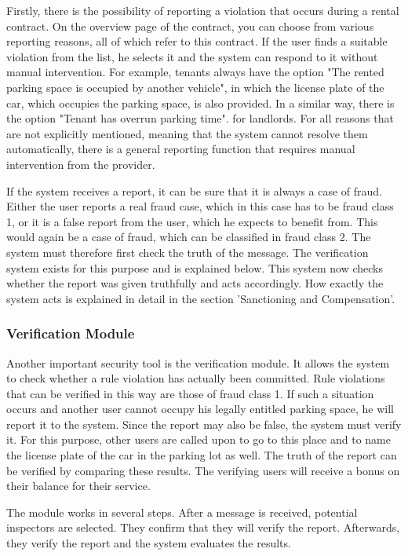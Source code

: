 \documentclass[
a4paper,     %
titlepage,   %
14pt         %
]{scrartcl}  %
\theoremstyle{mystyle}
\begin{document}
Firstly, there is the possibility of reporting a violation that occurs during a rental contract. On the overview page of the contract, you can choose from various reporting reasons, all of which refer to this contract. If the user finds a suitable violation from the list, he selects it and the system can respond to it without manual intervention. For example, tenants always have the option "The rented parking space is occupied by another vehicle", in which the license plate of the car, which occupies the parking space, is also provided. In a similar way, there is the option "Tenant has overrun parking time". for landlords. For all reasons that are not explicitly mentioned, meaning that the system cannot resolve them automatically, there is a general reporting function that requires manual intervention from the provider.

If the system receives a report, it can be sure that it is always a case of fraud. Either the user reports a real fraud case, which in this case has to be fraud class 1, or it is a false report from the user, which he expects to benefit from. This would again be a case of fraud, which can be classified in fraud class 2. The system must therefore first check the truth of the message. The verification system exists for this purpose and is explained below. This system now checks whether the report was given truthfully and acts accordingly. How exactly the system acts is explained in detail in the section 'Sanctioning and Compensation'.

\subsubsection{Verification Module} Another important security tool is the verification module. It allows the system to check whether a rule violation has actually been committed. Rule violations that can be verified in this way are those of fraud class 1. If such a situation occurs and another user cannot occupy his legally entitled parking space, he will report it to the system. Since the report may also be false, the system must verify it. For this purpose, other users are called upon to go to this place and to name the license plate of the car in the parking lot as well. The truth of the report can be verified by comparing these results. The verifying users will receive a bonus on their balance for their service.

The module works in several steps. After a message is received, potential inspectors are selected. They confirm that they will verify the report. Afterwards, they verify the report and the system evaluates the results. \\
\end{document}
